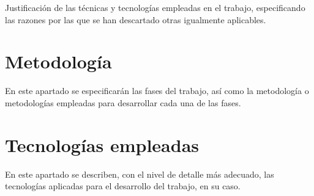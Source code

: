 Justificación de las técnicas y tecnologías empleadas en el trabajo, especificando las razones por las que se han descartado otras igualmente aplicables.

\section{Metodología}

En este apartado se especificarán las fases del trabajo, así como la metodología o metodologías empleadas para desarrollar cada una de las fases. 

\section{Tecnologías empleadas}

En este apartado se describen, con el nivel de detalle más adecuado, las tecnologías aplicadas para el desarrollo del trabajo, en su caso.



